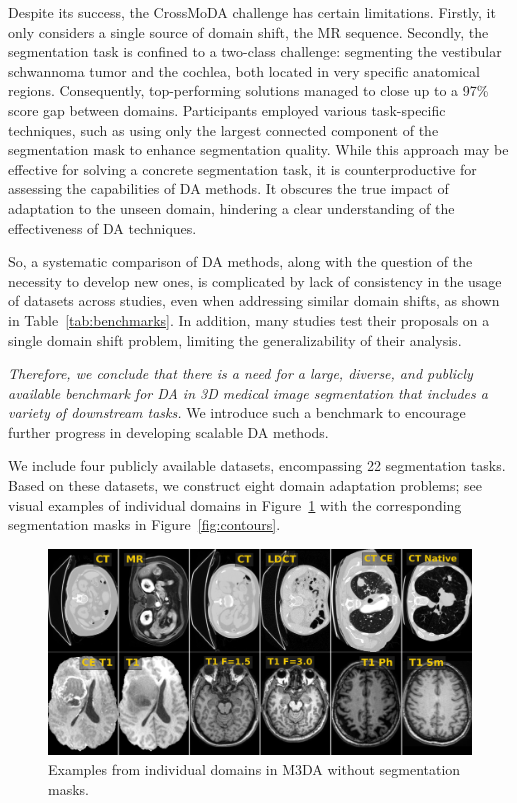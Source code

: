 Despite its success, the CrossMoDA challenge has certain limitations. Firstly, it only considers a single source of domain shift, the MR sequence. Secondly, the segmentation task is confined to a two-class challenge: segmenting the vestibular schwannoma tumor and the cochlea, both located in very specific anatomical regions. Consequently, top-performing solutions managed to close up to a 97\% score gap between domains. Participants employed various task-specific techniques, such as using only the largest connected component of the segmentation mask to enhance segmentation quality. While this approach may be effective for solving a concrete segmentation task, it is counterproductive for assessing the capabilities of DA methods. It obscures the true impact of adaptation to the unseen domain, hindering a clear understanding of the effectiveness of DA techniques.

So, a systematic comparison of DA methods, along with the question of the necessity to develop new ones, is complicated by lack of consistency in the usage of datasets across studies, even when addressing similar domain shifts, as shown in Table~\ref{tab:benchmarks}. In addition, many studies test their proposals on a single domain shift problem, limiting the generalizability of their analysis.





\textit{Therefore, we conclude that there is a need for a large, diverse, and publicly available benchmark for DA in 3D medical image segmentation that includes a variety of downstream tasks.} We introduce such a benchmark to encourage further progress in developing scalable DA methods.

We include four publicly available datasets, encompassing 22 segmentation tasks. Based on these datasets, we construct eight domain adaptation problems; see visual examples of individual domains in Figure~\ref{fig:teaser2} with the corresponding segmentation masks in Figure~\ref{fig:contours}.

\begin{figure}[h]
	\centering
	\includegraphics[width=1\linewidth]{Dissertation/Figures/4_da_bench/fig2_bench_examples.png}
	\caption{Examples from individual domains in M3DA without segmentation masks.}%
	\label{fig:teaser2}
\end{figure}

